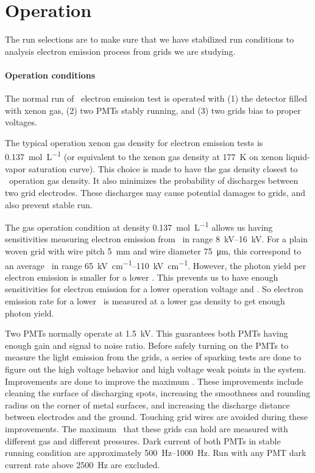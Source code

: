 \section{Operation} %


The run selections are to make sure that we have stabilized run conditions to analysis electron emission process from grids we are studying. %

\paragraph{Operation conditions} %
The normal run of \gtest\ electron emission test is operated with (1) the detector filled with xenon gas, (2) two PMTs stably running, and (3) two grids bias to proper voltages. 

The typical operation xenon gas density for electron emission tests is \SI{0.137}{\mole\per\liter} (or equivalent to the xenon gas density at \SI{177}{\kelvin} on xenon liquid-vapor saturation curve). This choice is made to have the gas density closest to \lze\ operation gas density. It also minimizes the probability of discharges between two grid electrodes. These discharges may cause potential damages to grids, and also prevent stable run. 

The gas operation condition at density \SI{0.137}{\mole\per\liter} allows us having sensitivities measuring electron emission from \opdv\ in range \SIrange{8}{16}{\kV}. For a plain woven grid with wire pitch \SI{5}{mm} and wire diameter \SI{75}{\um}, this correspond to an average \wsef\ in range \SIrange{65}{110}{\kV\per\cm}. However, the photon yield per electron emission is smaller for a lower \opdv . This prevents us to have enough sensitivities for electron emission for a lower operation voltage and \wsef . So electron emission rate for a lower \wsef\ is measured at a lower gas density to get enough photon yield. 

Two PMTs normally operate at \SI{1.5}{\kV}. This guarantees both PMTs having enough gain and signal to noise ratio. Before safely turning on the PMTs to measure the light emission from the grids, a series of sparking tests are done to figure out the high voltage behavior and high voltage weak points in the system. Improvements are done to improve the maximum \opvtvb . These improvements include cleaning the surface of discharging spots, increasing the smoothness and rounding radius on the corner of metal surfaces, and increasing the discharge distance between electrodes and the ground. Touching grid wires are avoided during these improvements. The maximum \opvtvb\ that these grids can hold are measured with different gas and different pressures. Dark current of both PMTs in stable running condition are approximately \SIrange{500}{1000}{\Hz}. Run with any PMT dark current rate above \SI{2500}{\Hz} are excluded. 

